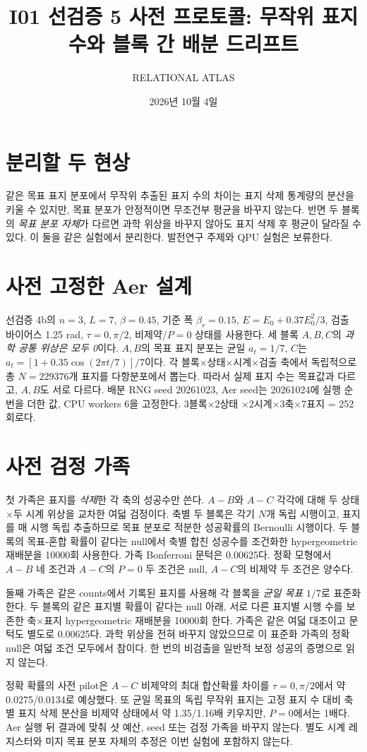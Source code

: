 \documentclass[11pt,a4paper]{article}
\title{I01 선검증 5 사전 프로토콜: 무작위 표지 수와 블록 간 배분 드리프트}
\author{RELATIONAL ATLAS}
\date{2026년 10월 4일}
\begin{document}
\maketitle

\section{분리할 두 현상}
같은 목표 표지 분포에서 무작위 추출된 표지 수의 차이는
표지 삭제 통계량의 분산을 키울 수 있지만, 목표 분포가 안정적이면
무조건부 평균을 바꾸지 않는다. 반면 두 블록의 \emph{목표 분포
자체}가 다르면 과학 위상을 바꾸지 않아도 표지 삭제 후 평균이
달라질 수 있다. 이 둘을 같은 실험에서 분리한다. 발전연구 주제와
QPU 실험은 보류한다.

\section{사전 고정한 Aer 설계}
선검증 4b의 $n=3$, $L=7$, $\beta=0.45$, 기준 폭
$\beta_r=0.15$, $E=E_0+0.37E_0^2/3$, 검출 바이어스
1.25 rad, $\tau=0,\pi/2$, 비제약/$P=0$ 상태를 사용한다.
세 블록 $A,B,C$의 \emph{과학 공통 위상은 모두 0}이다.
$A,B$의 목표 표지 분포는 균일 $a_t=1/7$,
$C$는 $a_t=[1+0.35\cos(2\pi t/7)]/7$이다.
각 블록$\times$상태$\times$시계$\times$검출 축에서 독립적으로
총 $N=229376$개 표지를 다항분포에서 뽑는다.
따라서 실제 표지 수는 목표값과 다르고, $A,B$도 서로 다르다.
배분 RNG seed 20261023, Aer seed는 20261024에 실행 순번을
더한 값, CPU workers 6을 고정한다. 3블록$\times$2상태
$\times$2시계$\times$3축$\times$7표지 = 252회로다.

\section{사전 검정 가족}
첫 가족은 표지를 \emph{삭제}한 각 축의 성공수만 쓴다.
$A-B$와 $A-C$ 각각에 대해 두 상태$\times$두 시계 위상을
교차한 여덟 검정이다. 축별 두 블록은 각기 $N$개 독립 시행이고,
표지를 매 시행 독립 추출하므로 목표 분포로 적분한 성공확률의
Bernoulli 시행이다. 두 블록의 목표-혼합 확률이 같다는 null에서
축별 합친 성공수를 조건화한 hypergeometric 재배분을
10000회 사용한다. 가족 Bonferroni 문턱은 0.00625다.
정확 모형에서 $A-B$ 네 조건과 $A-C$의 $P=0$ 두 조건은 null,
$A-C$의 비제약 두 조건은 양수다.

둘째 가족은 같은 counts에서 기록된 표지를 사용해 각 블록을
\emph{균일 목표} $1/7$로 표준화한다. 두 블록의 같은 표지별
확률이 같다는 null 아래, 서로 다른 표지별 시행 수를 보존한
축$\times$표지 hypergeometric 재배분을 10000회 한다.
가족은 같은 여덟 대조이고 문턱도 별도로 0.00625다.
과학 위상을 전혀 바꾸지 않았으므로 이 표준화 가족의 정확
null은 여덟 조건 모두에서 참이다. 한 번의 비검출을 일반적
보정 성공의 증명으로 읽지 않는다.

정확 확률의 사전 pilot은 $A-C$ 비제약의 최대 합산확률 차이를
$\tau=0,\pi/2$에서 약 0.0275/0.0134로 예상했다.
또 균일 목표의 독립 무작위 표지는 고정 표지 수 대비 축별
표지 삭제 분산을 비제약 상태에서 약 1.35/1.16배 키우지만,
$P=0$에서는 1배다. Aer 실행 뒤 결과에 맞춰 샷 예산,
seed 또는 검정 가족을 바꾸지 않는다. 별도 시계 레지스터와
미지 목표 분포 자체의 추정은 이번 실험에 포함하지 않는다.
\end{document}
